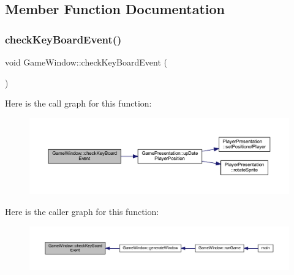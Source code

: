 \subsection{Member Function Documentation}
\mbox{\label{class_game_window_a6d969bf2a5284c731c5ba3eb03d4e3a1}} 
\subsubsection{\texorpdfstring{check\+Key\+Board\+Event()}{checkKeyBoardEvent()}}
{\footnotesize\ttfamily void Game\+Window\+::check\+Key\+Board\+Event (\begin{DoxyParamCaption}{ }\end{DoxyParamCaption})}

Here is the call graph for this function\+:\nopagebreak
\begin{figure}[H]
\begin{center}
\leavevmode
\includegraphics[width=350pt]{class_game_window_a6d969bf2a5284c731c5ba3eb03d4e3a1_cgraph}
\end{center}
\end{figure}
Here is the caller graph for this function\+:\nopagebreak
\begin{figure}[H]
\begin{center}
\leavevmode
\includegraphics[width=350pt]{class_game_window_a6d969bf2a5284c731c5ba3eb03d4e3a1_icgraph}
\end{center}
\end{figure}
\mbox{\label{class_game_window_a119f405a2ff052c74d902c5b02bf0f05}} 
